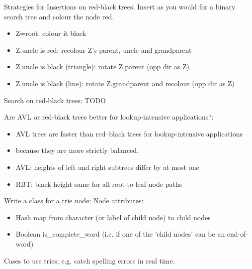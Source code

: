\documentclass{article}
\begin{document}
Strategies for Insertions on red-black trees; Insert as you would for a binary search tree and colour the node red. \begin{itemize} \item Z=root: colour it black \item Z.uncle is red: recolour Z's parent, uncle and grandparent \item Z.uncle is black (triangle): rotate Z.parent (opp dir as Z) \item Z.uncle is black (line): rotate Z.grandparent and recolour (opp dir as Z) \end{itemize}

Search on red-black trees; TODO

Are AVL or red-black trees better for lookup-intensive applications?; \begin{itemize} \item AVL trees are faster than red–black trees for lookup-intensive applications \item because they are more strictly balanced.  \item AVL: heights of left and right subtrees differ by at most one \item RBT: black height same for all root-to-leaf-node paths \end{itemize}

Write a class for a trie node; Node attributes: \begin{itemize} \item Hash map from character (or label of child node) to child nodes \item Boolean is\_complete\_word (i.e. if one of the 'child nodes' can be an end-of-word) \end{itemize}

Cases to use tries; e.g. catch spelling errors in real time.
\end{document}
